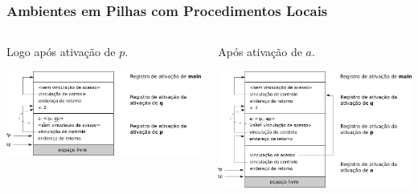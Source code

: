 \documentclass[table]{beamer}
\begin{document}
\begin{frame}
   \frametitle{Ambientes em Pilhas com Procedimentos Locais}
   \begin{columns}
   \begin{column}{0.5\textwidth}
   Logo após ativação de $p$.
   \begin{center}
   \includegraphics[width=\linewidth,height=\textheight,keepaspectratio]{figuras/procedimentosparametros01.png}
   \end{center}
   \end{column}
   \begin{column}{0.5\textwidth}
   Após ativação de  $a$.
   \begin{center}
   \includegraphics[width=\linewidth,height=\textheight,keepaspectratio]{figuras/procedimentosparametros02.png}
   \end{center}
   \end{column}
   \end{columns}
\end{frame}
\end{document}
